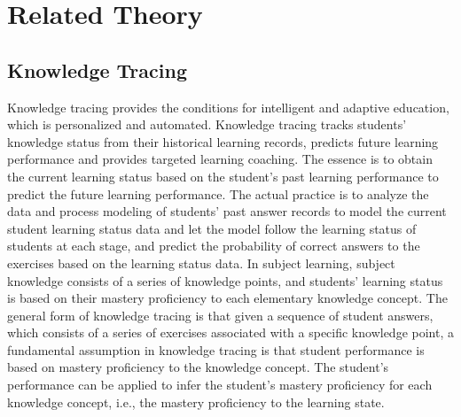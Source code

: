 \section{Related Theory}
\subsection{Knowledge Tracing}



Knowledge tracing provides the conditions for intelligent and adaptive education, which is personalized and automated. Knowledge tracing tracks students' knowledge status from their historical learning records, predicts future learning performance and provides targeted learning coaching. The essence is to obtain the current learning status based on the student's past learning performance to predict the future learning performance. The actual practice is to analyze the data and process modeling of students' past answer records to model the current student learning status data and let the model follow the learning status of students at each stage, and predict the probability of correct answers to the exercises based on the learning status data. In subject learning, subject knowledge consists of a series of knowledge points, and students' learning status is based on their mastery proficiency to each elementary knowledge concept. The general form of knowledge tracing is that given a sequence of student answers, which consists of a series of exercises associated with a specific knowledge point, a fundamental assumption in knowledge tracing is that student performance is based on mastery proficiency to the knowledge concept. The student's performance can be applied to infer the student's mastery proficiency for each knowledge concept, i.e., the mastery proficiency to the learning state.

